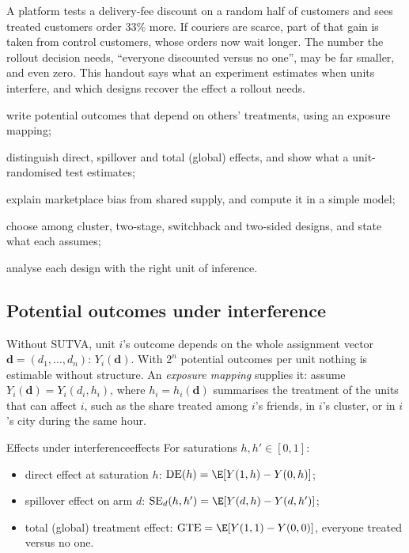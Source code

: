\documentclass[11pt]{article}
\begin{document}

\begin{decision}
A platform tests a delivery-fee discount on a random half of customers and sees treated customers order 33\%
more. If couriers are scarce, part of that gain is taken from control customers, whose orders now wait longer.
The number the rollout decision needs, ``everyone discounted versus no one'', may be far smaller, and even zero.
This handout says what an experiment estimates when units interfere, and which designs recover the effect a
rollout needs.
\end{decision}

\begin{goals}
  \item write potential outcomes that depend on others' treatments, using an exposure mapping;
  \item distinguish direct, spillover and total (global) effects, and show what a unit-randomised test estimates;
  \item explain marketplace bias from shared supply, and compute it in a simple model;
  \item choose among cluster, two-stage, switchback and two-sided designs, and state what each assumes;
  \item analyse each design with the right unit of inference.
\end{goals}

\sectionone

\subsection{Potential outcomes under interference}

Without SUTVA, unit $i$'s outcome depends on the whole assignment vector $\mathbf{d} = (d_1, \dots, d_n)$:
$Y_i(\mathbf{d})$. With $2^n$ potential outcomes per unit nothing is estimable without structure. An
\emph{exposure mapping} supplies it: assume $Y_i(\mathbf{d}) = Y_i(d_i, h_i)$, where $h_i = h_i(\mathbf{d})$ summarises the
treatment of the units that can affect $i$, such as the share treated among $i$'s friends, in $i$'s cluster, or in
$i$'s city during the same hour.

\begin{defn}{Effects under interference}{effects}
For saturations $h, h' \in [0,1]$:
\begin{itemize}[leftmargin=1.2em]
  \item direct effect at saturation $h$: $\text{DE}(h) = \E[Y(1,h) - Y(0,h)]$;
  \item spillover effect on arm $d$: $\text{SE}_d(h, h') = \E[Y(d,h) - Y(d,h')]$;
  \item total (global) treatment effect: $\text{GTE} = \E[Y(1,1) - Y(0,0)]$, everyone treated versus no one.
\end{itemize}
\end{defn}
\end{document}
